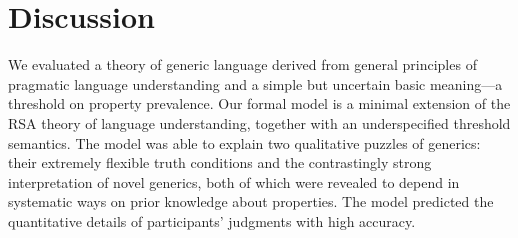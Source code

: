 \documentclass[10pt,letterpaper]{article}
\begin{document}



%

\section*{Discussion}

We evaluated a theory of generic language derived from general principles of pragmatic language understanding and a simple but uncertain basic meaning---a threshold on property prevalence.
Our formal model is a minimal extension of the RSA theory of language understanding, together with an underspecified threshold semantics.
The model was able to explain two qualitative puzzles of generics: their extremely flexible truth conditions and the contrastingly strong interpretation of novel generics, both of which were revealed to depend in systematic ways on prior knowledge about properties. The model predicted the quantitative details of participants' judgments with high accuracy.
\end{document}
